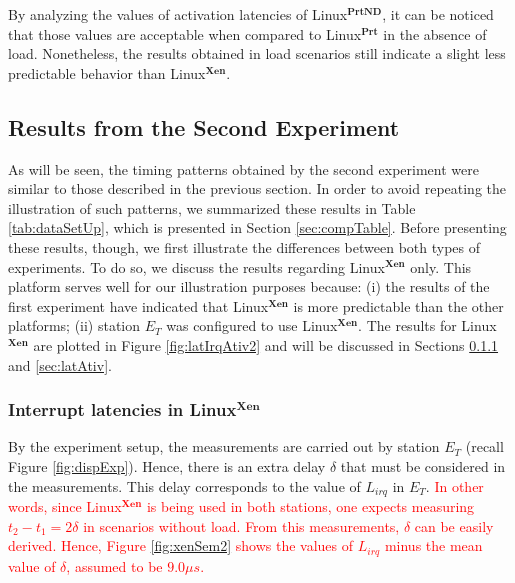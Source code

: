 \documentclass{acm_proc_article-sp}
\newcommand{\col}[1]{\textcolor{red}{#1}}
\begin{document}
By analyzing the values of activation latencies of Linux$^{\mathbf{PrtND}}$, 
it can be noticed that those values are acceptable when compared to
Linux$^{\mathbf{Prt}}$ in the absence of load. 
Nonetheless, the results obtained in load scenarios still indicate a slight
less predictable behavior than Linux$^{\mathbf{Xen}}$.

\subsection{Results from the Second Experiment}
\label{sec:results-2}

As will be seen, the timing patterns obtained by the second experiment were similar
to those described in the previous section. In order to avoid repeating the
illustration of such patterns, we summarized these results in Table
\ref{tab:dataSetUp}, which is presented in Section \ref{sec:compTable}. Before
presenting these results, though, we first illustrate the differences between both
types of experiments. To do so, we discuss the results regarding
Linux$^{\mathbf{Xen}}$ only. This platform serves well for our illustration purposes
because: (i) the results of the first experiment have indicated that
Linux$^{\mathbf{Xen}}$ is more predictable than the other platforms; (ii) station
$E_T$ was configured to use Linux$^{\mathbf{Xen}}$.  The results for
Linux$^{\mathbf{Xen}}$ are plotted in Figure \ref{fig:latIrqAtiv2} and will be
discussed in Sections \ref{sec:latIrq} and \ref{sec:latAtiv}.

\subsubsection{Interrupt latencies in Linux$^{\mathbf{Xen}}$}
\label{sec:latIrq}

By the experiment setup, the measurements are carried out by station $E_T$ (recall
Figure \ref{fig:dispExp}). Hence, there is an extra delay $\delta$ that must be
considered in the measurements. This delay corresponds to the value of $L_{irq}$ in
$E_T$. \col{In other words, since Linux$^{\mathbf{Xen}}$ is being used in both
  stations, one expects measuring $t_2 - t_1 = 2 \delta$ in scenarios without
  load. From this measurements, $\delta$ can be easily derived. Hence, Figure
  \ref{fig:xenSem2} shows the values of $L_{irq}$ minus the mean value of $\delta$,
assumed to be $9.0 \mu s$.}

\end{document}
